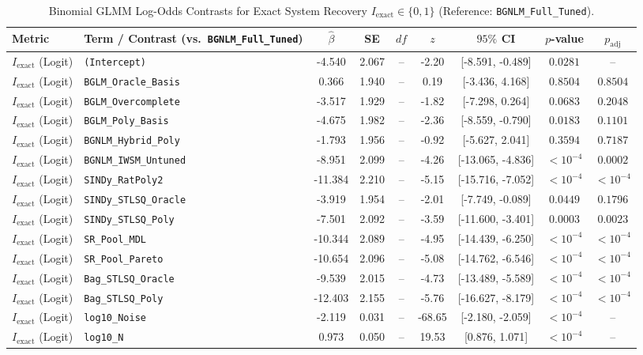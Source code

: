 \begin{table}[t]
\centering
\caption{Binomial GLMM Log-Odds Contrasts for Exact System Recovery $I_{\text{exact}} \in \{0,1\}$ (Reference: \texttt{BGNLM\_Full\_Tuned}).}
\label{tab:mixed_effects_glmm}
\scriptsize
\setlength{\tabcolsep}{3.5pt}
\renewcommand{\arraystretch}{0.88}
\begin{tabular}{llccccccc}
\toprule
Metric & Term / Contrast (vs.\ \texttt{BGNLM\_Full\_Tuned}) & $\hat{\beta}$ & SE & $df$ & $z$ & $95\%$ CI & $p$-value & $p_{\text{adj}}$ \\
\midrule
$I_{\text{exact}}$ (Logit) & \texttt{(Intercept)} & -4.540 & 2.067 & -- & -2.20 & [-8.591, -0.489] & $0.0281$ & -- \\
$I_{\text{exact}}$ (Logit) & \texttt{BGLM\_Oracle\_Basis} & 0.366 & 1.940 & -- & 0.19 & [-3.436, 4.168] & $0.8504$ & $0.8504$ \\
$I_{\text{exact}}$ (Logit) & \texttt{BGLM\_Overcomplete} & -3.517 & 1.929 & -- & -1.82 & [-7.298, 0.264] & $0.0683$ & $0.2048$ \\
$I_{\text{exact}}$ (Logit) & \texttt{BGLM\_Poly\_Basis} & -4.675 & 1.982 & -- & -2.36 & [-8.559, -0.790] & $0.0183$ & $0.1101$ \\
$I_{\text{exact}}$ (Logit) & \texttt{BGNLM\_Hybrid\_Poly} & -1.793 & 1.956 & -- & -0.92 & [-5.627, 2.041] & $0.3594$ & $0.7187$ \\
$I_{\text{exact}}$ (Logit) & \texttt{BGNLM\_IWSM\_Untuned} & -8.951 & 2.099 & -- & -4.26 & [-13.065, -4.836] & $< 10^{-4}$ & $0.0002$ \\
$I_{\text{exact}}$ (Logit) & \texttt{SINDy\_RatPoly2} & -11.384 & 2.210 & -- & -5.15 & [-15.716, -7.052] & $< 10^{-4}$ & $< 10^{-4}$ \\
$I_{\text{exact}}$ (Logit) & \texttt{SINDy\_STLSQ\_Oracle} & -3.919 & 1.954 & -- & -2.01 & [-7.749, -0.089] & $0.0449$ & $0.1796$ \\
$I_{\text{exact}}$ (Logit) & \texttt{SINDy\_STLSQ\_Poly} & -7.501 & 2.092 & -- & -3.59 & [-11.600, -3.401] & $0.0003$ & $0.0023$ \\
$I_{\text{exact}}$ (Logit) & \texttt{SR\_Pool\_MDL} & -10.344 & 2.089 & -- & -4.95 & [-14.439, -6.250] & $< 10^{-4}$ & $< 10^{-4}$ \\
$I_{\text{exact}}$ (Logit) & \texttt{SR\_Pool\_Pareto} & -10.654 & 2.096 & -- & -5.08 & [-14.762, -6.546] & $< 10^{-4}$ & $< 10^{-4}$ \\
$I_{\text{exact}}$ (Logit) & \texttt{Bag\_STLSQ\_Oracle} & -9.539 & 2.015 & -- & -4.73 & [-13.489, -5.589] & $< 10^{-4}$ & $< 10^{-4}$ \\
$I_{\text{exact}}$ (Logit) & \texttt{Bag\_STLSQ\_Poly} & -12.403 & 2.155 & -- & -5.76 & [-16.627, -8.179] & $< 10^{-4}$ & $< 10^{-4}$ \\
$I_{\text{exact}}$ (Logit) & \texttt{log10\_Noise} & -2.119 & 0.031 & -- & -68.65 & [-2.180, -2.059] & $< 10^{-4}$ & -- \\
$I_{\text{exact}}$ (Logit) & \texttt{log10\_N} & 0.973 & 0.050 & -- & 19.53 & [0.876, 1.071] & $< 10^{-4}$ & -- \\
\bottomrule
\end{tabular}
\end{table}
